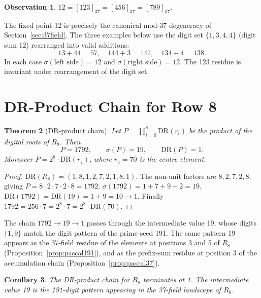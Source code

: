 \documentclass[12pt]{article}
\newtheorem{theorem}{Theorem}[section]
\newtheorem{corollary}[theorem]{Corollary}
\newtheorem{observation}[theorem]{Observation}
\begin{document}
\begin{observation}
$12 = [123]_{37} = [456]_{37} = [789]_{37}$.
\end{observation}

The fixed point 12 is precisely the canonical mod-37 degeneracy of
Section~\ref{sec:37field}.  The three examples below use the digit set
$\{1,3,4,4\}$ (digit sum 12) rearranged into valid additions:
\[
    13+44=57,\quad 144+3=147,\quad 134+4=138.
\]
In each case $\sigma(\text{left side}) = 12$ and $\sigma(\text{right side}) = 12$.
The 123 residue is invariant under rearrangement of the digit set.

\section{DR-Product Chain for Row 8}
\label{sec:drproduct}

\begin{theorem}[DR-product chain]
\label{thm:drproduct}
Let $P = \prod_{i=0}^{8} \mathrm{DR}(r_i)$ be the product of the digital
roots of $R_8$.  Then
\[
    P = 1792,\qquad \sigma(P) = 19,\qquad \mathrm{DR}(P) = 1.
\]
Moreover $P = 2^8 \cdot \mathrm{DR}(r_4)$, where $r_4 = 70$ is the centre
element.
\end{theorem}

\begin{proof}
$\mathrm{DR}(R_8) = (1,8,1,2,7,2,1,8,1)$.  The non-unit factors are
$8,2,7,2,8$, giving $P = 8\cdot2\cdot7\cdot2\cdot8 = 1792$.
$\sigma(1792)=1+7+9+2=19$.  $\mathrm{DR}(1792)=\mathrm{DR}(19)=1+9=10
\to 1$.  Finally $1792 = 256\cdot7 = 2^8\cdot7 = 2^8\cdot\mathrm{DR}(70)$.
\end{proof}

The chain $1792 \to 19 \to 1$ passes through the intermediate value 19,
whose digits $\{1,9\}$ match the digit pattern of the prime seed 191.
The same pattern 19 appears as the 37-field residue of the elements at
positions 3 and 5 of $R_8$ (Proposition~\ref{prop:pascal191}), and as the
prefix-sum residue at position 3 of the accumulation chain
(Proposition~\ref{prop:pascal37}).

\begin{corollary}
The DR-product chain for $R_8$ terminates at 1.  The intermediate value 19
is the 191-digit pattern appearing in the 37-field landscape of $R_8$.
\end{corollary}
\end{document}
